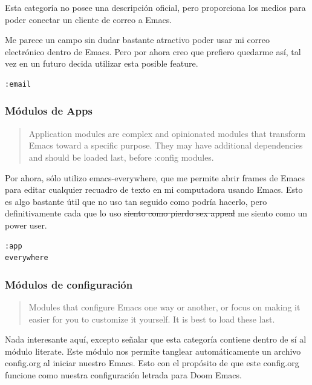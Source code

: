 \documentclass[11pt]{article}
\begin{document}
Esta categoría no posee una descripción oficial, pero proporciona los medios para poder conectar un cliente de correo a Emacs.

Me parece un campo sin dudar bastante atractivo poder usar mi correo electrónico dentro de Emacs. Pero por ahora creo que prefiero quedarme así, tal vez en un futuro decida utilizar esta posible feature.

\begin{verbatim}
:email

\end{verbatim}
\subsubsection{Módulos de Apps}
\label{sec:orgd4c87b2}

\begin{quote}
Application modules are complex and opinionated modules that transform Emacs toward a specific purpose. They may have additional dependencies and should be loaded last, before :config modules.
\end{quote}

Por ahora, sólo utilizo emacs-everywhere, que me permite abrir frames de Emacs para editar cualquier recuadro de texto en mi computadora usando Emacs. Esto es algo bastante útil que no uso tan seguido como podría hacerlo, pero definitivamente cada que lo uso \sout{siento como pierdo sex appeal} me siento como un power user.

\begin{verbatim}
:app
everywhere

\end{verbatim}
\subsubsection{Módulos de configuración}
\label{sec:orgeaf7348}

\begin{quote}
Modules that configure Emacs one way or another, or focus on making it easier for you to customize it yourself. It is best to load these last.
\end{quote}

Nada interesante aquí, excepto señalar que esta categoría contiene dentro de sí al módulo literate. Este módulo nos permite tanglear automáticamente un archivo config.org al iniciar nuestro Emacs. Esto con el propósito de que este config.org funcione como nuestra configuración letrada para Doom Emacs.
\end{document}
